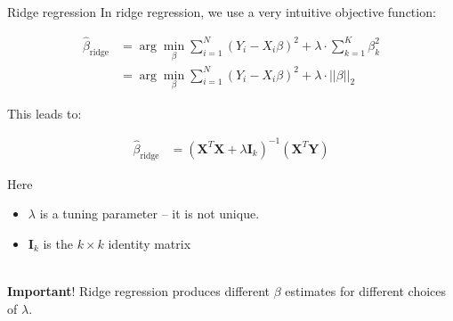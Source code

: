 \documentclass[mathserif, aspectratio=169]{beamer}
\begin{document}
\begin{frame}{Ridge regression}
In ridge regression, we use a very intuitive objective function:

\begin{align*}
\hat{\beta}_{\text{ridge}} &= \arg \min_\beta \sum_{i=1}^N \left(Y_i - X_i \beta \right)^2+\lambda \cdot \sum_{k=1}^K \beta_k^2\\
&= \arg \min_\beta \sum_{i=1}^N \left(Y_i - X_i \beta \right)^2+\lambda \cdot ||\beta||_2
\end{align*}

This leads to:

\begin{align*}
\hat{\beta}_\text{ridge} &=\left(\mathbf{X}^T\mathbf{X} + \lambda\mathbf{I}_k\right)^{-1} \left(\mathbf{X}^T\mathbf{Y}\right)
\end{align*}

Here 
\begin{itemize}
\item $\lambda$ is a tuning parameter -- it is not unique.  
\item $\mathbf{I}_k$ is the $k\times k$ identity matrix\\~\\
\end{itemize}

\textbf{Important}! Ridge regression produces different $\beta$ estimates for different choices of $\lambda$.

\end{frame}
\end{document}
